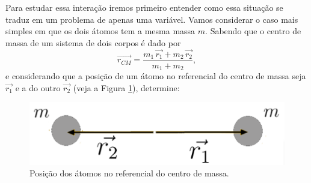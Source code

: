 \documentclass[]{IMTexam}
\begin{document}
\begin{questions}
	\question \label{ques:q1}
	Para estudar essa interação iremos primeiro entender como essa situação se traduz em um problema de apenas uma variável. Vamos considerar o caso mais simples em que os dois átomos tem a mesma massa $ m $. Sabendo que o centro de massa de um sistema de dois corpos é dado por \[ \vec{r_{CM}}=\dfrac{m_1\,\vec{r_1}+m_2\,\vec{r_2}}{m_1+m_2}, \]
	e considerando que a posição de um átomo no referencial do centro de massa seja $\vec{r_1}$ e a do outro $\vec{r_2}$ (veja a Figura \ref{fig:fig1}), determine:

	\begin{figure}[H]
		\centering
		\includegraphics[width=0.7\linewidth]{screenshot001}
		\caption{Posição dos átomos no referencial do centro de massa.}
		\label{fig:fig1}
	\end{figure}


\end{questions}
\end{document}
